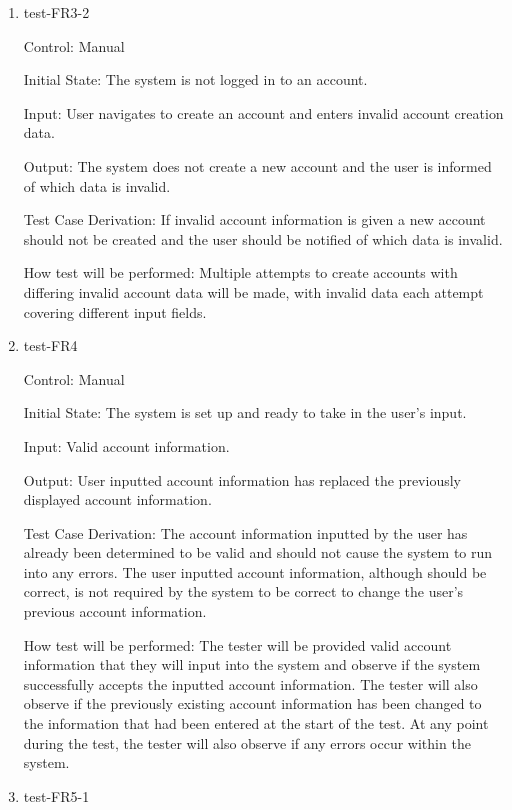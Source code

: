 \documentclass[12pt, titlepage]{article}
\begin{document}
\begin{enumerate}
  \item{test-FR3-2\\}

  Control: Manual
            
  Initial State: The system is not logged in to an account.
            
  Input: User navigates to create an account and enters invalid account
  creation data.
            
  Output: The system does not create a new account and the user is informed of
  which data is invalid.
  
  Test Case Derivation: If invalid account information is given a new account
  should not be created and the user should be notified of which data is
  invalid.
  
  How test will be performed: Multiple attempts to create accounts with
  differing invalid account data will be made, with invalid data each attempt
  covering different input fields.

  \item{test-FR4\\}

  Control: Manual
            
  Initial State: The system is set up and ready to take in the user's input.
            
  Input: Valid account information.
            
  Output: User inputted account information has replaced the previously displayed
  account information.

  Test Case Derivation: The account information inputted by the user has already been
  determined to be valid and should not cause the system to run into any errors. The
  user inputted account information, although should be correct, is not required by
  the system to be correct to change the user's previous account information.
            
  How test will be performed: The tester will be provided valid account information
  that they will input into the system and observe if the system successfully
  accepts the inputted account information. The tester will also observe if the previously
  existing account information has been changed to the information that had been entered
  at the start of the test. At any point during the test, the tester will also observe if
  any errors occur within the system.

  \item{test-FR5-1\\}


\end{enumerate}
\end{document}
